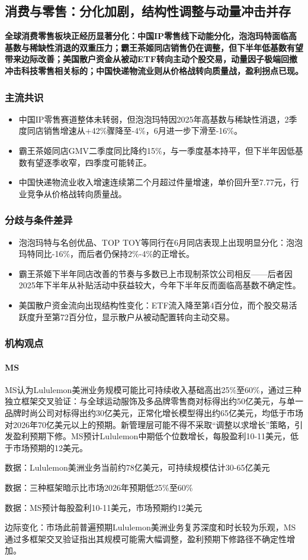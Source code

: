 \documentclass[11pt]{ctexart}
\begin{document}
\subsection{消费与零售：分化加剧，结构性调整与动量冲击并存}
\textbf{全球消费零售板块正经历显著分化：中国IP零售线下动能分化，泡泡玛特面临高基数与稀缺性消退的双重压力；霸王茶姬同店销售仍在调整，但下半年低基数有望带来边际改善；美国散户资金从被动ETF转向主动个股交易，动量因子极端回撤冲击科技零售相关标的；中国快递物流业则从价格战转向质量战，盈利拐点已现。}
\subsubsection*{主流共识}
\begin{itemize}
  \item 中国IP零售赛道整体未转弱，但泡泡玛特因2025年高基数与稀缺性消退，2季度同店销售增速从+42\%骤降至-4\%，6月进一步下滑至-16\%。
  \item 霸王茶姬同店GMV二季度同比降约15\%，与一季度基本持平，但下半年因低基数有望逐季收窄，四季度可能转正。
  \item 中国快递物流业收入增速连续第二个月超过件量增速，单价回升至7.77元，行业竞争从价格战转向质量战。
\end{itemize}
\subsubsection*{分歧与条件差异}
\begin{itemize}
  \item 泡泡玛特与名创优品、TOP TOY等同行在6月同店表现上出现明显分化：泡泡玛特同比-16\%，而后者仍保持2\%-4\%的正增长。
  \item 霸王茶姬下半年同店改善的节奏与多数已上市现制茶饮公司相反——后者因2025年下半年从补贴活动中获益较大，今年下半年反而面临高基数不确定性。
  \item 美国散户资金流向出现结构性变化：ETF流入降至第4百分位，而个股交易活跃度升至第72百分位，显示散户从被动配置转向主动交易。
\end{itemize}
\subsubsection*{机构观点}
\paragraph{MS} MS认为Lululemon美洲业务规模可能比可持续收入基础高出25\%至60\%，通过三种独立框架交叉验证：与全球运动服饰及多品牌零售商对标得出约50亿美元，与单一品牌时尚公司对标得出约30亿美元，正常化增长模型得出约65亿美元，均低于市场对2026年70亿美元以上的预期。新管理层可能不得不采取“调整以求增长”策略，引发盈利预期下修。MS预计Lululemon中期低个位数增长，每股盈利10-11美元，低于市场预期的12美元。
{\small\color{refgray}数据：Lululemon美洲业务当前约78亿美元，可持续规模估计30-65亿美元\par}
{\small\color{refgray}数据：三种框架暗示比市场2026年预期低25\%至60\%\par}
{\small\color{refgray}数据：MS预计每股盈利10-11美元，市场预期约12美元\par}
{\small\color{refgray}边际变化：市场此前普遍预期Lululemon美洲业务复苏深度和时长较为乐观，MS通过多框架交叉验证指出其规模可能需大幅调整，盈利预期下修路径不确定性增加。\par}
\end{document}
